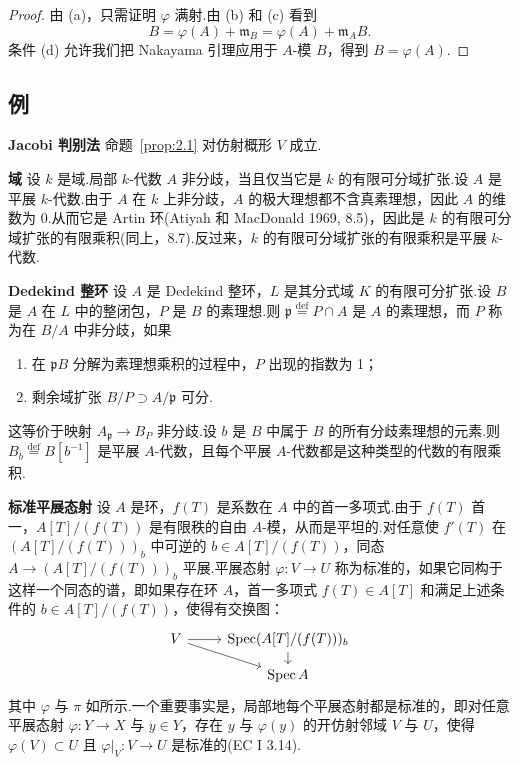 \begin{proof}
由 (a)，只需证明 $\varphi$ 满射.由 (b) 和 (c) 看到
\[
B = \varphi(A) + \mathfrak{m}_{B} = \varphi(A) + \mathfrak{m}_{A}B.
\]
条件 (d) 允许我们把 Nakayama 引理应用于 $A$-模 $B$，得到 $B = \varphi(A)$.
\end{proof}

\subsection*{例}

\textbf{Jacobi 判别法} 命题~\ref{prop:2.1} 对仿射概形 $V$ 成立.

\textbf{域} 设 $k$ 是域.局部 $k$-代数 $A$ 非分歧，当且仅当它是 $k$ 的有限可分域扩张.设 $A$ 是平展 $k$-代数.由于 $A$ 在 $k$ 上非分歧，$A$ 的极大理想都不含真素理想，因此 $A$ 的维数为 0.从而它是 Artin 环(Atiyah 和 MacDonald 1969, 8.5)，因此是 $k$ 的有限可分域扩张的有限乘积(同上，8.7).反过来，$k$ 的有限可分域扩张的有限乘积是平展 $k$-代数.

\textbf{Dedekind 整环} 设 $A$ 是 Dedekind 整环，$L$ 是其分式域 $K$ 的有限可分扩张.设 $B$ 是 $A$ 在 $L$ 中的整闭包，$P$ 是 $B$ 的素理想.则 $\mathfrak{p} \overset{\mathrm{def}}{=} P \cap A$ 是 $A$ 的素理想，而 $P$ 称为在 $B/A$ 中非分歧，如果
\begin{enumerate}
  \item 在 $\mathfrak{p}B$ 分解为素理想乘积的过程中，$P$ 出现的指数为 1；
  \item 剩余域扩张 $B/P \supset A/\mathfrak{p}$ 可分.
\end{enumerate}
这等价于映射 $A_{\mathfrak{p}} \to B_{P}$ 非分歧.设 $b$ 是 $B$ 中属于 $B$ 的所有分歧素理想的元素.则 $B_b \overset{\mathrm{def}}{=} B[b^{-1}]$ 是平展 $A$-代数，且每个平展 $A$-代数都是这种类型的代数的有限乘积.

\textbf{标准平展态射} 设 $A$ 是环，$f(T)$ 是系数在 $A$ 中的首一多项式.由于 $f(T)$ 首一，$A[T]/(f(T))$ 是有限秩的自由 $A$-模，从而是平坦的.对任意使 $f'(T)$ 在 $(A[T]/(f(T)))_{b}$ 中可逆的 $b \in A[T]/(f(T))$，同态 $A \to (A[T]/(f(T)))_{b}$ 平展.平展态射 $\varphi \colon V \to U$ 称为标准的，如果它同构于这样一个同态的谱，即如果存在环 $A$，首一多项式 $f(T) \in A[T]$ 和满足上述条件的 $b \in A[T]/(f(T))$，使得有交换图：
\[
\begin{tikzcd}[row sep=small]
  V \arrow[r] \arrow[rd] & \operatorname{Spec}(A[T]/(f(T)))_{b} \arrow[d] \\
                         & \operatorname{Spec} A
\end{tikzcd}
\]
其中 $\varphi$ 与 $\pi$ 如所示.一个重要事实是，局部地每个平展态射都是标准的，即对任意平展态射 $\varphi \colon Y \to X$ 与 $y \in Y$，存在 $y$ 与 $\varphi(y)$ 的开仿射邻域 $V$ 与 $U$，使得 $\varphi(V) \subset U$ 且 $\varphi|_{V} \colon V \to U$ 是标准的(EC I 3.14).

